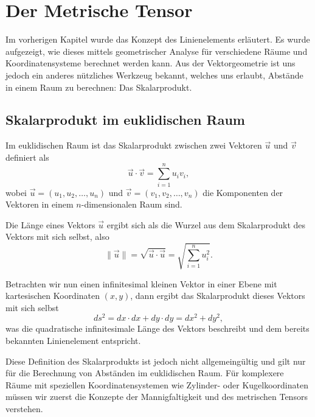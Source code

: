 %
%
%
\section{Der Metrische Tensor
\label{geodaeten:section:MetrischerTensor}}

Im vorherigen Kapitel wurde das Konzept des Linienelements erläutert.
Es wurde aufgezeigt, wie dieses mittels geometrischer Analyse für verschiedene Räume und Koordinatensysteme berechnet werden kann.
Aus der Vektorgeometrie ist uns jedoch ein anderes nützliches Werkzeug bekannt, welches uns erlaubt, Abstände in einem Raum zu berechnen: Das Skalarprodukt.

\subsection{Skalarprodukt im euklidischen Raum}
Im euklidischen Raum ist das Skalarprodukt zwischen zwei Vektoren $\vec{u}$ und $\vec{v}$ definiert als
\begin{equation}
	\vec{u} \cdot \vec{v} = \sum_{i=1}^n u_i v_i,
\end{equation}
wobei $\vec{u} = (u_1, u_2, \ldots, u_n)$ und $\vec{v} = (v_1, v_2, \ldots, v_n)$ die Komponenten der Vektoren in einem $n$-dimensionalen Raum sind.

Die Länge eines Vektors $\vec{u}$ ergibt sich als die Wurzel aus dem Skalarprodukt des Vektors mit sich selbst, also
\begin{equation}
	\|\vec{u}\| = \sqrt{\vec{u} \cdot \vec{u}} = \sqrt{\sum_{i=1}^n u_i^2}.
\end{equation}

Betrachten wir nun einen infinitesimal kleinen Vektor in einer Ebene mit kartesischen Koordinaten $(x, y)$, dann ergibt das Skalarprodukt dieses Vektors mit sich selbst
\begin{equation}
	ds^2 = dx \cdot dx + dy \cdot dy = dx^2 + dy^2,
\end{equation}
was die quadratische infinitesimale Länge des Vektors beschreibt und dem bereits bekannten Linienelement entspricht.

Diese Definition des Skalarprodukts ist jedoch nicht allgemeingültig und gilt nur für die Berechnung von Abständen im euklidischen Raum.
Für komplexere Räume mit speziellen Koordinatensystemen wie Zylinder- oder Kugelkoordinaten müssen wir zuerst die Konzepte der Mannigfaltigkeit und des metrischen Tensors verstehen.

